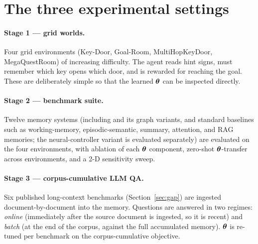 \section{The three experimental settings}
\paragraph{Stage 1 --- grid worlds.} Four grid environments (Key-Door,
Goal-Room, MultiHopKeyDoor, MegaQuestRoom) of increasing difficulty. The agent
reads hint signs, must remember which key opens which door, and is rewarded for
reaching the goal. These are deliberately simple so that the learned $\boldsymbol{\theta}$
can be inspected directly.

\paragraph{Stage 2 --- benchmark suite.} Twelve memory systems (including
\Vfour{} and its graph variants, and standard baselines such as
working-memory, episodic-semantic, summary, attention, and RAG memories; the
neural-controller variant is evaluated separately) are
evaluated on the four environments, with ablation of each $\boldsymbol{\theta}$ component,
zero-shot $\boldsymbol{\theta}$-transfer across environments, and a 2-D sensitivity sweep.

\paragraph{Stage 3 --- corpus-cumulative LLM QA.} Six published long-context
benchmarks (Section~\ref{sec:gap}) are ingested document-by-document into the
\Vt{} memory. Questions are answered in two regimes: \emph{online} (immediately
after the source document is ingested, so it is recent) and \emph{batch} (at the
end of the corpus, against the full accumulated memory). $\boldsymbol{\theta}$ is re-tuned
per benchmark on the corpus-cumulative \recallk{} objective.

